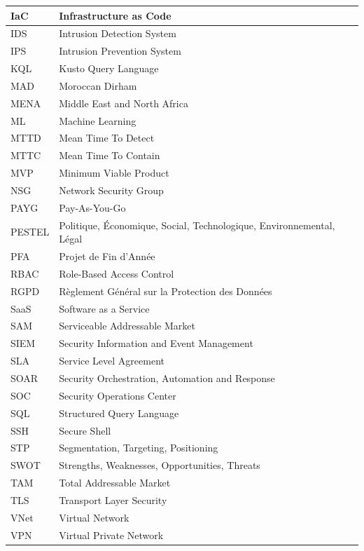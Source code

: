 \documentclass[11pt,a4paper]{report}
\begin{document}
\begin{longtable}{|L{3.5cm}|L{11cm}|}
IaC & Infrastructure as Code \\ \hline
IDS & Intrusion Detection System \\ \hline
IPS & Intrusion Prevention System \\ \hline
KQL & Kusto Query Language \\ \hline
MAD & Moroccan Dirham \\ \hline
MENA & Middle East and North Africa \\ \hline
ML & Machine Learning \\ \hline
MTTD & Mean Time To Detect \\ \hline
MTTC & Mean Time To Contain \\ \hline
MVP & Minimum Viable Product \\ \hline
NSG & Network Security Group \\ \hline
PAYG & Pay-As-You-Go \\ \hline
PESTEL & Politique, Économique, Social, Technologique, Environnemental, Légal \\ \hline
PFA & Projet de Fin d'Année \\ \hline
RBAC & Role-Based Access Control \\ \hline
RGPD & Règlement Général sur la Protection des Données \\ \hline
SaaS & Software as a Service \\ \hline
SAM & Serviceable Addressable Market \\ \hline
SIEM & Security Information and Event Management \\ \hline
SLA & Service Level Agreement \\ \hline
SOAR & Security Orchestration, Automation and Response \\ \hline
SOC & Security Operations Center \\ \hline
SQL & Structured Query Language \\ \hline
SSH & Secure Shell \\ \hline
STP & Segmentation, Targeting, Positioning \\ \hline
SWOT & Strengths, Weaknesses, Opportunities, Threats \\ \hline
TAM & Total Addressable Market \\ \hline
TLS & Transport Layer Security \\ \hline
VNet & Virtual Network \\ \hline
VPN & Virtual Private Network \\ \hline
\end{longtable}
\end{document}
